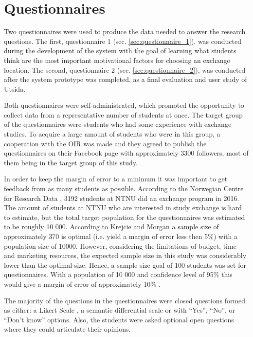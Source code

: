 \section{Questionnaires}

Two questionnaires were used to produce the data needed to answer the research questions. The first, questionnaire 1 (sec. \ref{sec:questionnaire_1}), was conducted during the development of the system with the goal of learning what students think are the most important motivational factors for choosing an exchange location. The second, questionnaire 2 (sec. \ref{sec:questionnaire_2}), was conducted after the system prototype was completed, as a final evaluation and user study of Utsida.

Both questionnaires were self-administrated, which promoted the opportunity to collect data from a representative number of students at once. The target group of the questionnaires were students who had some experience with exchange studies. To acquire a large amount of students who were in this group, a cooperation with the OIR was made and they agreed to publish the questionnaires on their Facebook page with approximately 3300 followers, most of them being in the target group of this study.

In order to keep the margin of error to a minimum it was important to get feedback from as many students as possible. According to the Norwegian Centre for Research Data \cite{utvekslingsopphold}, 3192 students at NTNU did an exchange program in 2016. The amount of students at NTNU who are interested in study exchange is hard to estimate, but the total target population for the questionnaires was estimated to be roughly 10 000. According to Krejcie and Morgan \cite{krejcie1970determining} a sample size of approximately 370 is optimal (i.e. yield a margin of error less then 5\%) with a population size of 10000. However, considering the limitations of budget, time and marketing resources, the expected sample size in this study was considerably lower than the optimal size. Hence, a sample size goal of 100 students was set for questionnaires. With a population of 10 000 and confidence level of 95\% this would give a margin of error of approximately 10\% \cite{yamane1973statistics}. 

The majority of the questions in the questionnaires were closed questions formed as either: a Likert Scale \cite{allen2007likert}, a semantic differential scale \cite{osgood1952nature} or with \enquote{Yes}, \enquote{No}, or \enquote{Don't know} options. Also, the students were asked optional open questions where they could articulate their opinions. 

